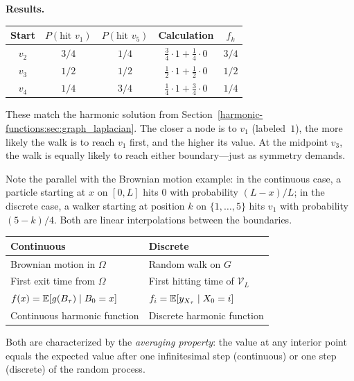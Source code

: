 \begin{notechapter}
\begin{examplebox}[title=Random Walk on the Path Graph]
\textbf{Results.}

\begin{center}
\begin{tabular}{ccccc}
\toprule
\textbf{Start} & $P(\text{hit } v_1)$ & $P(\text{hit } v_5)$ &
\textbf{Calculation} & $f_k$ \\
\midrule
$v_2$ & $3/4$ & $1/4$ & $\frac{3}{4}\cdot 1 + \frac{1}{4}\cdot 0$ &
  $3/4$ \\
$v_3$ & $1/2$ & $1/2$ & $\frac{1}{2}\cdot 1 + \frac{1}{2}\cdot 0$ &
  $1/2$ \\
$v_4$ & $1/4$ & $3/4$ & $\frac{1}{4}\cdot 1 + \frac{3}{4}\cdot 0$ &
  $1/4$ \\
\bottomrule
\end{tabular}
\end{center}

These match the harmonic solution from Section~\ref{harmonic-functions:sec:graph_laplacian}.
The closer a node is to $v_1$ (labeled~$1$), the more likely the walk is to
reach $v_1$ first, and the higher its value. At the midpoint $v_3$, the
walk is equally likely to reach either boundary---just as symmetry demands.

Note the parallel with the Brownian motion example: in the continuous case,
a particle starting at $x$ on $[0, L]$ hits $0$ with probability
$(L - x)/L$; in the discrete case, a walker starting at position $k$ on
$\{1, \ldots, 5\}$ hits $v_1$ with probability $(5 - k)/4$. Both are
linear interpolations between the boundaries.
\end{examplebox}

\begin{connectionbox}[title=The Complete Duality]
\begin{center}
\begin{tabular}{ll}
\toprule
\textbf{Continuous} & \textbf{Discrete} \\
\midrule
Brownian motion in $\Omega$ & Random walk on $G$ \\
First exit time from $\Omega$ & First hitting time of $\mathcal{V}_L$ \\
$f(x) = \mathbb{E}[g(B_\tau) \mid B_0 = x]$ &
$f_i = \mathbb{E}[y_{X_\tau} \mid X_0 = i]$ \\
Continuous harmonic function & Discrete harmonic function \\
\bottomrule
\end{tabular}
\end{center}
Both are characterized by the \emph{averaging property}: the value at any
interior point equals the expected value after one infinitesimal step
(continuous) or one step (discrete) of the random process.
\end{connectionbox}



\end{notechapter}
